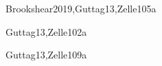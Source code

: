 \begin{syllabus}
\begin{unit}{\SPHistory}{}{Brookshear2019,Guttag13,Zelle10}{5}{a}
    \begin{learningoutcomes}
        \item \SPHistoryLOIdentifySignificant [\Familiarity]
        \item \SPHistoryLOIdentifyTheSeveral [\Familiarity]
        \item \SPHistoryLODiscussTheForLanguage [\Familiarity]
        \item \SPHistoryLOCompareDaily [\Assessment] 
    \end{learningoutcomes}
\end{unit}

\begin{unit}{\PLBasicTypeSystems}{}{Guttag13,Zelle10}{2}{a}
    \begin{topics}
        \item \PLBasicTypeSystemsTopicA
        \item \PLBasicTypeSystemsTopicAssociation
		\item \PLBasicTypeSystemsTopicType
    \end{topics}

    \begin{learningoutcomes}  
		\item \PLBasicTypeSystemsLOForBoth [\Familiarity]  
		\item \PLBasicTypeSystemsLOForA [\Familiarity]
		\item \PLBasicTypeSystemsLODescribeExamples [\Familiarity]
		\item \PLBasicTypeSystemsLOForMultiple [\Usage] 
		\item \PLBasicTypeSystemsLOUseTypes [\Usage] 
		\item \PLBasicTypeSystemsLODefineAndPieces [\Usage] 
    \end{learningoutcomes}
\end{unit}

\begin{unit}{\SDFFundamentalProgrammingConcepts}{}{Guttag13,Zelle10}{9}{a}
    \begin{topics}
        \item \SDFFundamentalProgrammingConceptsTopicBasic
        \item \SDFFundamentalProgrammingConceptsTopicVariables
        \item \SDFFundamentalProgrammingConceptsTopicExpressions
        \item \SDFFundamentalProgrammingConceptsTopicSimple
        \item \SDFFundamentalProgrammingConceptsTopicConditional
        \item \SDFFundamentalProgrammingConceptsTopicFunctions
        \item \SDFFundamentalProgrammingConceptsTopicThe
    \end{topics}


\end{unit}
\end{syllabus}
